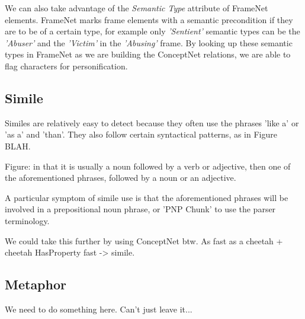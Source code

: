 We can also take advantage of the \textit{Semantic Type} attribute of FrameNet elements. FrameNet marks frame elements with a semantic precondition if they are to be of a certain type, for example only \textit{'Sentient'} semantic types can be the \textit{'Abuser'} and the \textit{'Victim'} in the \textit{'Abusing'} frame. By looking up these semantic types in FrameNet as we are building the ConceptNet relations, we are able to flag characters for personification.

\subsection{Simile}

Similes are relatively easy to detect because they often use the phrases 'like a' or 'as a' and 'than'. They also follow certain syntactical patterns, as in Figure BLAH.

Figure: in that it is usually a noun followed by a verb or adjective, then one of the aforementioned phrases, followed by a noun or an adjective.

A particular symptom of simile use is that the aforementioned phrases will be involved in a prepositional noun phrase, or 'PNP Chunk' to use the parser terminology.

We could take this further by using ConceptNet btw. As fast as a cheetah + cheetah HasProperty fast -> simile.

\subsection{Metaphor}

We need to do something here. Can't just leave it...



